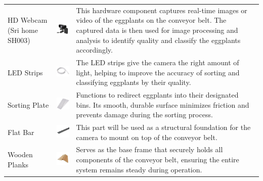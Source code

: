 {\begin{longtable}{
		>{\centering\arraybackslash}m{3cm}  
		>{\centering\arraybackslash}m{4cm} 
		>{\arraybackslash}m{6cm}
	}
	HD Webcam (Sri home SH003) &
	\includegraphics[width=3cm]{figures/camera} &
	This hardware component captures real-time images or video of the eggplants on the conveyor belt. The captured data is then used for image processing and analysis to identify quality and classify the eggplants accordingly. \\
	
	LED Strips &
	\includegraphics[width=3cm]{figures/led} &
	The LED strips give the camera the right amount of light, helping to improve the accuracy of sorting and classifying eggplants by their quality. \\
	
	Sorting Plate &
	\includegraphics[width=3cm]{figures/plate} &
	Functions to redirect eggplants into their designated bins. Its smooth, durable surface minimizes friction and prevents damage during the sorting process. \\
	
	Flat Bar&
	\includegraphics[width=3cm]{figures/flat_bar} &
	This part will be used as a structural foundation for the camera to mount on top of the conveyor belt. \\
	
	Wooden Planks &
	\includegraphics[width=3cm]{figures/planks} &
	Serves as the base frame that securely holds all components of the conveyor belt, ensuring the entire system remains steady during operation. \\
	

\end{longtable}}
